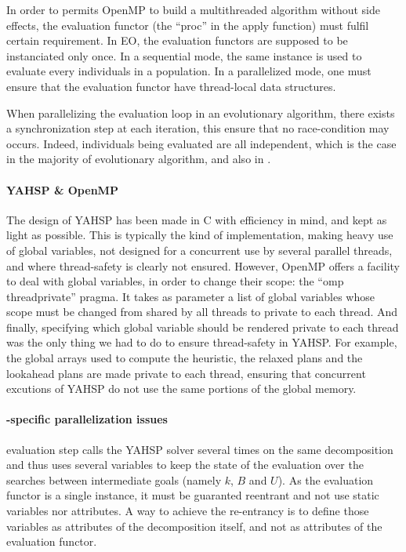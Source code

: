 \documentclass{sig-alternate}
\begin{document}
In order to permits OpenMP to build a multithreaded algorithm without side
effects, the evaluation functor (the ``proc'' in the apply function) must fulfil certain requirement. 
In EO, the evaluation functors are supposed to be instanciated only once. In a
sequential mode, the same instance is used to evaluate every individuals in a
population. In a parallelized mode, one must ensure that the evaluation functor
have thread-local data structures.

When parallelizing the evaluation loop in an evolutionary algorithm, there
exists a synchronization step at each iteration, this ensure that no race-condition
may occurs. Indeed, individuals being evaluated are all independent, which is
the case in the majority of evolutionary algorithm, and also in \DAE.

\paragraph{YAHSP \& OpenMP} %

The design  of YAHSP has  been made in  C with efficiency  in mind, and  kept as
light as  possible. This is typically  the kind of  implementation, making heavy
use of global  variables, not designed for a concurrent  use by several parallel
threads, and where thread-safety is clearly not ensured.  However, OpenMP offers
a facility  to deal with global variables,  in order to change  their scope: the
``omp threadprivate'' pragma.  It takes  as parameter a list of global variables
whose  scope must  be changed  from shared  by all  threads to  private  to each
thread.   And  finally, specifying  which  global  variable  should be  rendered
private to each thread  was the only thing we had to  do to ensure thread-safety
in YAHSP.   For example, the  global arrays used  to compute the  heuristic, the
relaxed plans and the lookahead plans  are made private to each thread, ensuring
that concurrent  excutions of YAHSP do not  use the same portions  of the global
memory.

\paragraph{\DAE-specific parallelization issues} %

\DAE evaluation step calls the YAHSP solver several times on the same
decomposition and thus uses several variables to keep the state of the
evaluation over the searches between intermediate goals (namely $k$, $B$ and
$U$).  As the evaluation functor is a single instance, it must be guaranted
reentrant and not use static variables nor attributes. A way to achieve the
re-entrancy is to define those variables as attributes of the decomposition
itself, and not as attributes of the evaluation functor.
\end{document}
